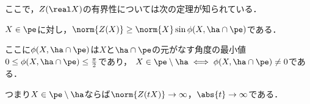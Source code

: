 ここで，$Z(\real X) $の有界性については次の定理が知られている．

\begin{thm}\cite[Lemmma~5.4]{kob97}\label{thm:kob97}
  
  $X\in \pe$に対し，$\norm{Z(X)}\geq \norm{X} \sin\phi(X, \ha\cap\pe)$である．

  ここに$\phi(X,\ha\cap \pe) $は$X$と$\ha\cap \pe$の元がなす角度の最小値$0\leq \phi(X,\ha\cap \pe) \leq \frac{\pi}{2} $であり，
  $X\in \pe\setminus \ha \iff \phi(X,\ha\cap \pe)\neq 0 $である．
\end{thm}
つまり$ X\in \pe\setminus \ha$ならば$\norm{Z(t X)}\to \infty $，$\abs{t}\to \infty $である．



